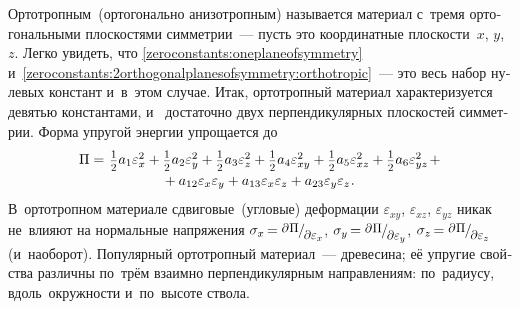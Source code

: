 \begin{otherlanguage}{russian}
Ортотропным~(ортогонально анизотропным) называется материал с~тремя ортогональными плоскостями симметрии~--- пусть это координатные плоскости~$x$, $y$, $z$. Легко увидеть, что \eqref{zeroconstants:oneplaneofsymmetry} и~\eqref{zeroconstants:2orthogonalplanesofsymmetry:orthotropic}~--- это весь набор нулевых констант и~в~этом случае. Итак, ортотропный материал характеризуется девятью константами, и~ достаточно двух перпендикулярных плоскостей симметрии. Форма упругой энергии упрощается до
\[ \begin{array}{c}
\Pi =^{\mathstrut^{\mathstrut}} \smalldisplaystyleonehalf a_1 \varepsilon^2_{x} + \smalldisplaystyleonehalf a_2 \varepsilon^2_{y} + \smalldisplaystyleonehalf a_3 \varepsilon^2_{z} + \smalldisplaystyleonehalf a_4 \varepsilon^2_{xy} + \smalldisplaystyleonehalf a_5 \varepsilon^2_{xz} + \smalldisplaystyleonehalf a_6 \varepsilon^2_{yz} \hspace{0.25ex} + \\[.32em]
+ \hspace{0.5ex} a_{12} \varepsilon_{x} \varepsilon_{y} + a_{13} \varepsilon_{x} \varepsilon_{z} + a_{23} \varepsilon_{y} \varepsilon_{z} \hspace{0.1ex} .
\end{array} \]
В~ортотропном материале сдвиговые~(угловые) деформации $\varepsilon_{xy}$, $\varepsilon_{xz}$, $\varepsilon_{yz}$ никак не~влияют на нормальные напряжения ${\sigma_x \hspace{-0.25ex} = \raisemath{0.16em}{\scalebox{0.88}{$\partial \hspace{0.1ex} \Pi$}} \hspace{-0.1ex} / \hspace{-0.2ex} \raisemath{-0.32em}{\scalebox{0.88}{$\partial \varepsilon_x$}}}$, ${\sigma_y \hspace{-0.25ex} = \raisemath{0.16em}{\scalebox{0.88}{$\partial \hspace{0.1ex} \Pi$}} \hspace{-0.1ex} / \hspace{-0.2ex} \raisemath{-0.32em}{\scalebox{0.88}{$\partial \varepsilon_y$}}}$, ${\sigma_z \hspace{-0.25ex} = \raisemath{0.16em}{\scalebox{0.88}{$\partial \hspace{0.1ex} \Pi$}} \hspace{-0.1ex} / \hspace{-0.2ex} \raisemath{-0.32em}{\scalebox{0.88}{$\partial \varepsilon_z$}}}$ (и~наоборот). Популярный ортотропный материал~--- древесина; её упругие свойства различны по~трём взаимно перпендикулярным направлениям: по~радиусу, вдоль~окружности и~по~высоте ствола.


\end{otherlanguage}
